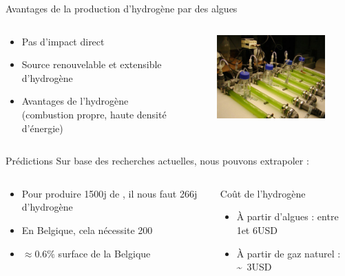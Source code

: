 \documentclass{beamer}
\begin{document}
\begin{frame}{Avantages de la production d'hydrogène par des algues}
	\begin{columns}
		\begin{column}{0.40\textwidth}
		\begin{itemize}
		\item Pas d'impact  direct
		\item Source renouvelable et extensible d'hydrogène
		\item Avantages de l'hydrogène (combustion propre, haute densité d'énergie)
		\end{itemize}
		\end{column}
		\begin{column}{0.40\textwidth}
		\begin{figure}
		\includegraphics[scale=0.4]{schema/algues_labo.jpg}
		\end{figure}
		
		\end{column}
	\end{columns}
\end{frame}
\begin{frame}{Prédictions}
	    Sur base des recherches actuelles, nous pouvons extrapoler :
	\begin{columns}
		\begin{column}{0.40\textwidth}
		\begin{itemize}
		\item Pour produire \unit{1500}{\ton\per j} de , il nous faut \unit{266}{\ton\per j} d'hydrogène
		\item En Belgique, cela nécessite \unit{200}{\kilo\meter\squared}
		\item $\approx \unit{0.6}{\%}$ surface de la Belgique
		\end{itemize}
		\end{column}
		\begin{column}{0.40\textwidth}
		Coût de l'hydrogène
		\begin{itemize}
		\item À partir d'algues : entre \unit{1}{}et \unit{6}{USD\per\kilogram}
		\item À partir de gaz naturel : \unit{\sim 3}{USD\per\kilogram}
		\end{itemize}
		\end{column}
	\end{columns}
\end{frame}
\end{document}
